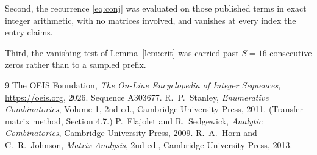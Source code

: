 \documentclass[11pt,a4paper]{article}
\theoremstyle{plain}
\theoremstyle{definition}
\begin{document}
Second, the recurrence \eqref{eq:conj} was evaluated on those published terms in exact
integer arithmetic, with no matrices involved, and vanishes at every index the entry claims.

Third, the vanishing test of Lemma~\ref{lem:crit} was carried past $S=16$ consecutive
zeros rather than to a sampled prefix.

\begin{thebibliography}{9}
 The OEIS Foundation, \emph{The On-Line Encyclopedia of Integer
Sequences}, \url{https://oeis.org}, 2026. Sequence A303677.
 R.~P.~Stanley, \emph{Enumerative Combinatorics}, Volume 1, 2nd ed.,
Cambridge University Press, 2011. (Transfer-matrix method, Section 4.7.)
 P.~Flajolet and R.~Sedgewick, \emph{Analytic Combinatorics}, Cambridge
University Press, 2009.
 R.~A.~Horn and C.~R.~Johnson, \emph{Matrix Analysis}, 2nd ed., Cambridge
University Press, 2013.
\end{thebibliography}
\end{document}
